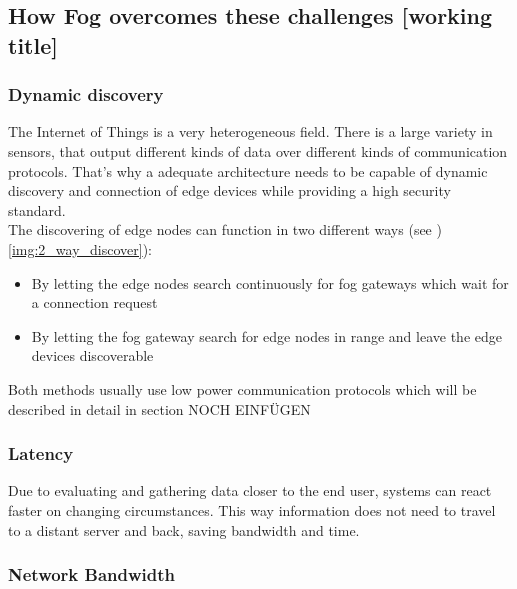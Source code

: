 \subsection{How Fog overcomes these challenges [working title]}

\subsubsection{Dynamic discovery}
The Internet of Things is a very heterogeneous field. There is a large variety in sensors, that output  different kinds of data over different kinds of communication protocols. That's why a adequate architecture needs to be capable of dynamic discovery and connection of edge devices while providing a high security standard.\\
The discovering of edge nodes can function in two different ways (see )\autoref{img:2_way_discover}):
\begin{itemize}
	\item By letting the edge nodes search continuously for fog gateways which wait for a connection request
	\item By letting the fog gateway search for edge nodes in range and leave the edge devices discoverable
\end{itemize}


Both methods usually use low power communication protocols which will be described in detail in section NOCH EINFÜGEN


\subsubsection{Latency}

Due to evaluating and gathering data closer to the end user, systems can react faster on changing circumstances. This way information does not need to travel to a distant server and back, saving bandwidth and time.

\subsubsection{Network Bandwidth}

